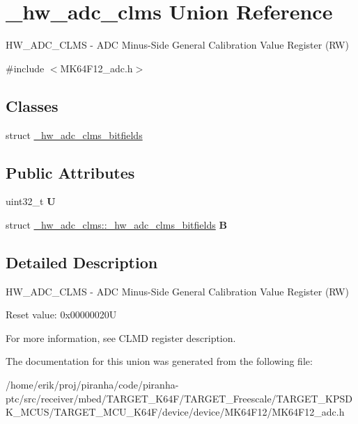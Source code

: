 \hypertarget{union__hw__adc__clms}{}\section{\+\_\+hw\+\_\+adc\+\_\+clms Union Reference}
\label{union__hw__adc__clms}


H\+W\+\_\+\+A\+D\+C\+\_\+\+C\+L\+MS -\/ A\+DC Minus-\/\+Side General Calibration Value Register (RW)  




{\ttfamily \#include $<$M\+K64\+F12\+\_\+adc.\+h$>$}

\subsection*{Classes}
\begin{DoxyCompactItemize}
\item 
struct \hyperlink{struct__hw__adc__clms_1_1__hw__adc__clms__bitfields}{\+\_\+hw\+\_\+adc\+\_\+clms\+\_\+bitfields}
\end{DoxyCompactItemize}
\subsection*{Public Attributes}
\begin{DoxyCompactItemize}
\item 
uint32\+\_\+t {\bfseries U}\hypertarget{union__hw__adc__clms_a9311289df6bbc2240219a6245ddc69d6}{}\label{union__hw__adc__clms_a9311289df6bbc2240219a6245ddc69d6}

\item 
struct \hyperlink{struct__hw__adc__clms_1_1__hw__adc__clms__bitfields}{\+\_\+hw\+\_\+adc\+\_\+clms\+::\+\_\+hw\+\_\+adc\+\_\+clms\+\_\+bitfields} {\bfseries B}\hypertarget{union__hw__adc__clms_a53cb4a89751f5589edb0f1ff76232b8e}{}\label{union__hw__adc__clms_a53cb4a89751f5589edb0f1ff76232b8e}

\end{DoxyCompactItemize}


\subsection{Detailed Description}
H\+W\+\_\+\+A\+D\+C\+\_\+\+C\+L\+MS -\/ A\+DC Minus-\/\+Side General Calibration Value Register (RW) 

Reset value\+: 0x00000020U

For more information, see C\+L\+MD register description. 

The documentation for this union was generated from the following file\+:\begin{DoxyCompactItemize}
\item 
/home/erik/proj/piranha/code/piranha-\/ptc/src/receiver/mbed/\+T\+A\+R\+G\+E\+T\+\_\+\+K64\+F/\+T\+A\+R\+G\+E\+T\+\_\+\+Freescale/\+T\+A\+R\+G\+E\+T\+\_\+\+K\+P\+S\+D\+K\+\_\+\+M\+C\+U\+S/\+T\+A\+R\+G\+E\+T\+\_\+\+M\+C\+U\+\_\+\+K64\+F/device/device/\+M\+K64\+F12/M\+K64\+F12\+\_\+adc.\+h\end{DoxyCompactItemize}
